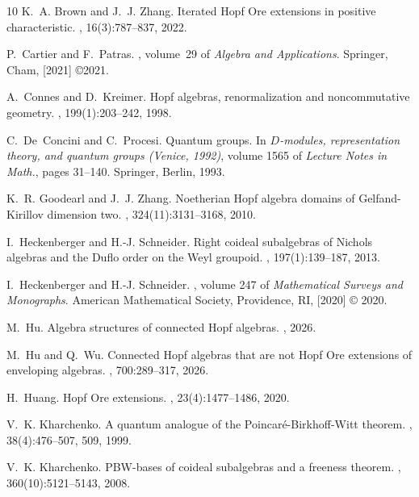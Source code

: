 \documentclass{article}
\theoremstyle{plain}
\theoremstyle{definition}
\numberwithin{equation}{section}
\begin{document}
\begin{thebibliography}{10}
K.~A. Brown and J.~J. Zhang.
\newblock Iterated {H}opf {O}re extensions in positive characteristic.
, 16(3):787--837, 2022.

P.~Cartier and F.~Patras.
, volume~29 of
  {\em Algebra and Applications}.
\newblock Springer, Cham, [2021] \copyright 2021.

A.~Connes and D.~Kreimer.
\newblock Hopf algebras, renormalization and noncommutative geometry.
, 199(1):203--242, 1998.

C.~De~Concini and C.~Procesi.
\newblock Quantum groups.
\newblock In {\em {$D$}-modules, representation theory, and quantum groups
  ({V}enice, 1992)}, volume 1565 of {\em Lecture Notes in Math.}, pages
  31--140. Springer, Berlin, 1993.

K.~R. Goodearl and J.~J. Zhang.
\newblock Noetherian {H}opf algebra domains of {G}elfand-{K}irillov dimension
  two.
, 324(11):3131--3168, 2010.

I.~Heckenberger and H.-J. Schneider.
\newblock Right coideal subalgebras of {N}ichols algebras and the {D}uflo order
  on the {W}eyl groupoid.
, 197(1):139--187, 2013.

I.~Heckenberger and H.-J. Schneider.
, volume 247 of {\em Mathematical
  Surveys and Monographs}.
\newblock American Mathematical Society, Providence, RI, [2020] \copyright
  2020.

M.~Hu.
\newblock Algebra structures of connected {H}opf algebras.
, 2026.

M.~Hu and Q.~Wu.
\newblock Connected {H}opf algebras that are not {H}opf {O}re extensions of
  enveloping algebras.
, 700:289--317, 2026.

H.~Huang.
\newblock Hopf {O}re extensions.
, 23(4):1477--1486, 2020.

V.~K. Kharchenko.
\newblock A quantum analogue of the {P}oincar\'e-{B}irkhoff-{W}itt theorem.
, 38(4):476--507, 509, 1999.

V.~K. Kharchenko.
\newblock P{BW}-bases of coideal subalgebras and a freeness theorem.
, 360(10):5121--5143, 2008.


\end{thebibliography}
\end{document}
